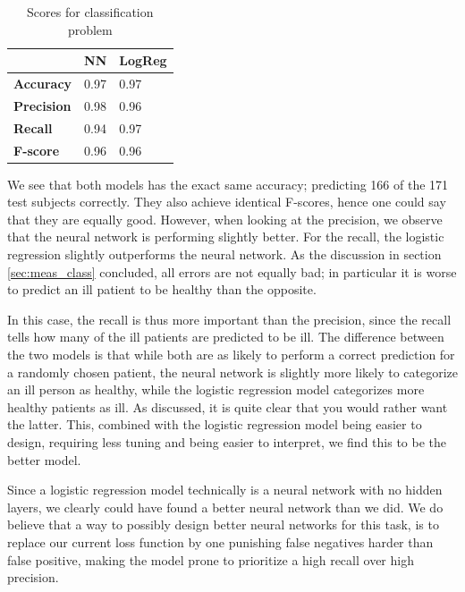 \begin{table}[h]
    \centering
    \begin{tabular}{|m{8em}|m{8.5em}|m{8.5em}|}
    \hline
         & \textbf{NN} & \textbf{LogReg} \\
    \hline
        \textbf{Accuracy} & 0.97 & 0.97\\
    \hline
        \textbf{Precision} & 0.98 & 0.96 \\
    \hline
        \textbf{Recall} & 0.94 & 0.97 \\
    \hline
        \textbf{F-score} & 0.96 & 0.96 \\
    \hline
    \end{tabular}
    \caption{Scores for classification problem}
    \label{tab:class_score}
\end{table}

We see that both models has the exact same accuracy; predicting 166 of the 171 test subjects correctly.
They also achieve identical F-scores, hence one could say that they are equally good.
However, when looking at the precision, we observe that the neural network is performing slightly better.
For the recall, the logistic regression slightly outperforms the neural network.
As the discussion in section \ref{sec:meas_class} concluded, all errors are not equally bad; in particular it is worse to predict an ill patient to be healthy than the opposite.

In this case, the recall is thus more important than the precision, since the recall tells how many of the ill patients are predicted to be ill.
The difference between the two models is that while both are as likely to perform a correct prediction for a randomly chosen patient, the neural network is slightly more likely to categorize an ill person as healthy, while the logistic regression model categorizes more healthy patients as ill.
As discussed, it is quite clear that you would rather want the latter.
This, combined with the logistic regression model being easier to design, requiring less tuning and being easier to interpret, we find this to be the better model.

Since a logistic regression model technically is a neural network with no hidden layers, we clearly could have found a better neural network than we did.
We do believe that a way to possibly design better neural networks for this task, is to replace our current loss function by one punishing false negatives harder than false positive, making the model prone to prioritize a high recall over high precision.